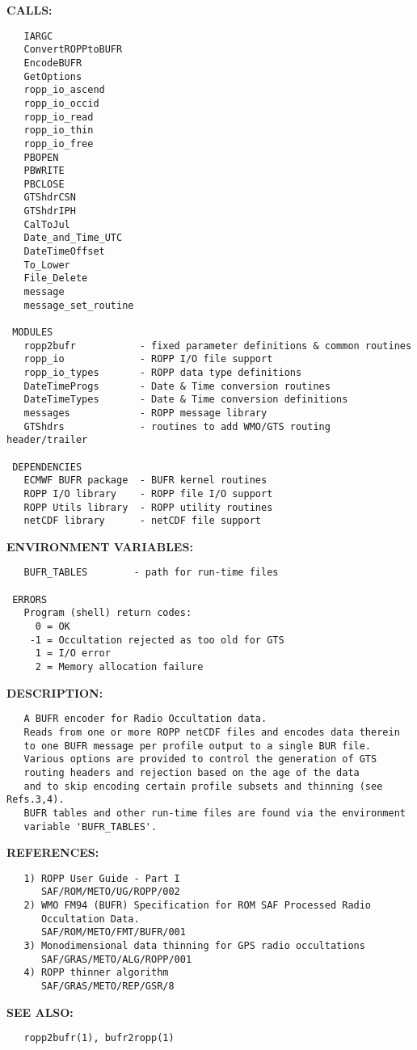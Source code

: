 \textbf{CALLS:}\hspace{0.08in}\begin{Verbatim}
   IARGC
   ConvertROPPtoBUFR
   EncodeBUFR
   GetOptions
   ropp_io_ascend
   ropp_io_occid
   ropp_io_read
   ropp_io_thin
   ropp_io_free
   PBOPEN
   PBWRITE
   PBCLOSE
   GTShdrCSN
   GTShdrIPH
   CalToJul
   Date_and_Time_UTC
   DateTimeOffset
   To_Lower
   File_Delete
   message
   message_set_routine

 MODULES
   ropp2bufr           - fixed parameter definitions & common routines
   ropp_io             - ROPP I/O file support
   ropp_io_types       - ROPP data type definitions
   DateTimeProgs       - Date & Time conversion routines
   DateTimeTypes       - Date & Time conversion definitions
   messages            - ROPP message library
   GTShdrs             - routines to add WMO/GTS routing header/trailer

 DEPENDENCIES
   ECMWF BUFR package  - BUFR kernel routines
   ROPP I/O library    - ROPP file I/O support
   ROPP Utils library  - ROPP utility routines
   netCDF library      - netCDF file support
\end{Verbatim}
\textbf{ENVIRONMENT VARIABLES:}\hspace{0.08in}\begin{Verbatim}
   BUFR_TABLES        - path for run-time files

 ERRORS
   Program (shell) return codes:
     0 = OK
    -1 = Occultation rejected as too old for GTS
     1 = I/O error
     2 = Memory allocation failure
\end{Verbatim}
\textbf{DESCRIPTION:}\hspace{0.08in}\begin{Verbatim}
   A BUFR encoder for Radio Occultation data.
   Reads from one or more ROPP netCDF files and encodes data therein
   to one BUFR message per profile output to a single BUR file.
   Various options are provided to control the generation of GTS
   routing headers and rejection based on the age of the data
   and to skip encoding certain profile subsets and thinning (see Refs.3,4).
   BUFR tables and other run-time files are found via the environment
   variable 'BUFR_TABLES'.
\end{Verbatim}
\textbf{REFERENCES:}\hspace{0.08in}\begin{Verbatim}
   1) ROPP User Guide - Part I
      SAF/ROM/METO/UG/ROPP/002
   2) WMO FM94 (BUFR) Specification for ROM SAF Processed Radio
      Occultation Data.
      SAF/ROM/METO/FMT/BUFR/001
   3) Monodimensional data thinning for GPS radio occultations
      SAF/GRAS/METO/ALG/ROPP/001
   4) ROPP thinner algorithm
      SAF/GRAS/METO/REP/GSR/8
\end{Verbatim}
\textbf{SEE ALSO:}\hspace{0.08in}\begin{Verbatim}
   ropp2bufr(1), bufr2ropp(1)
\end{Verbatim}
